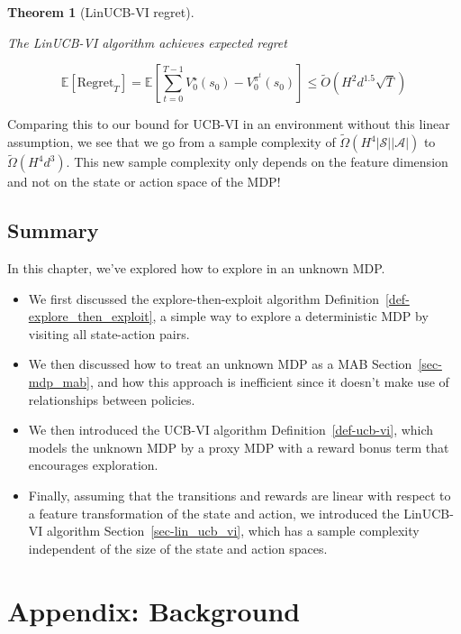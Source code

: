 \documentclass[
  letterpaper,
  DIV=11,
  numbers=noendperiod]{scrreprt}
\theoremstyle{plain}
\theoremstyle{plain}
\newtheorem{theorem}{Theorem}[chapter]
\theoremstyle{definition}
\theoremstyle{definition}
\theoremstyle{remark}
\begin{document}
\begin{theorem}[LinUCB-VI
regret]\protect\hypertarget{thm-lin_ucb_vi_regret}{}\label{thm-lin_ucb_vi_regret}

The LinUCB-VI algorithm achieves expected regret

\[\mathbb{E}[\text{Regret}_T] = \mathbb{E}\left[\sum_{t=0}^{T-1} V^\star_0(s_0) - V^{\pi^t}_0(s_0) \right] \le \tilde O(H^2 d^{1.5} \sqrt{T})\]

\end{theorem}

Comparing this to our bound for UCB-VI in an environment without this
linear assumption, we see that we go from a sample complexity of
\(\tilde \Omega(H^4 |\mathcal{S}||\mathcal{A}|)\) to
\(\tilde \Omega(H^4 d^{3})\). This new sample complexity only depends on
the feature dimension and not on the state or action space of the MDP!

\section{Summary}\label{summary-7}

In this chapter, we've explored how to explore in an unknown MDP.

\begin{itemize}
\item
  We first discussed the explore-then-exploit algorithm
  Definition~\ref{def-explore_then_exploit}, a simple way to explore a
  deterministic MDP by visiting all state-action pairs.
\item
  We then discussed how to treat an unknown MDP as a MAB
  Section~\ref{sec-mdp_mab}, and how this approach is inefficient since
  it doesn't make use of relationships between policies.
\item
  We then introduced the UCB-VI algorithm Definition~\ref{def-ucb-vi},
  which models the unknown MDP by a proxy MDP with a reward bonus term
  that encourages exploration.
\item
  Finally, assuming that the transitions and rewards are linear with
  respect to a feature transformation of the state and action, we
  introduced the LinUCB-VI algorithm Section~\ref{sec-lin_ucb_vi}, which
  has a sample complexity independent of the size of the state and
  action spaces.
\end{itemize}


\chapter{Appendix: Background}\label{sec-background}
\end{document}
